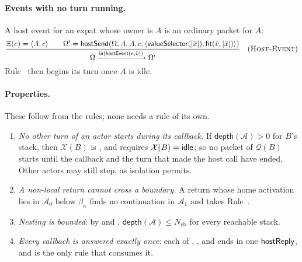 \paragraph{Events with no turn running.}
A host event for an expat whose owner is $A$ is an ordinary packet for $A$:
\[
\dfrac{\Xi(e)=\langle A,c\rangle\qquad
 \Omega'=\mathsf{hostSend}(\Omega,A,A,c,
   \langle\mathsf{valueSelector}(|\bar x|),\mathsf{fit}(\bar v,|\bar x|)\rangle)}
 {\Omega\xrightarrow{\mathsf{in}(\mathsf{hostEvent}(e,\bar v))}\Omega'}
\quad(\textsc{Host-Event})
\]
Rule~ then begins its turn once $A$ is idle.

\paragraph{Properties.}
These follow from the rules; none needs a rule of its own.
\begin{enumerate}
\item \emph{No other turn of an actor starts during its callback.}  If
      $\mathsf{depth}(\mathcal A)>0$ for $B$'s stack, then
      $\mathcal X(B)$ is , and  requires
      $\mathcal X(B)=\mathsf{idle}$; so no packet of $\mathcal Q(B)$ starts until
      the callback and the turn that made the host call have ended.  Other
      actors may still step, as isolation permits.
\item \emph{A non-local return cannot cross a boundary.}  A return whose home
      activation lies in $\mathcal A_0$ below $\beta_\kappa$ finds no
      continuation in $\mathcal A_1$ and takes Rule~.
\item \emph{Nesting is bounded}: by  and
      , $\mathsf{depth}(\mathcal A)\le
      N_{\mathrm{cb}}$ for every reachable stack.
\item \emph{Every callback is answered exactly once}: each of
      , ,
       and  ends in
      one $\mathsf{hostReply}$, and  is the only rule that
      consumes it.
\end{enumerate}

